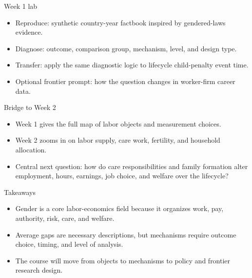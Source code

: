\documentclass[aspectratio=169,11pt]{beamer}
\begin{document}
\begin{frame}{Week 1 lab}
\begin{itemize}
    \item Reproduce: synthetic country-year factbook inspired by gendered-laws evidence.
    \item Diagnose: outcome, comparison group, mechanism, level, and design type.
    \item Transfer: apply the same diagnostic logic to lifecycle child-penalty event time.
    \item Optional frontier prompt: how the question changes in worker-firm career data.
\end{itemize}
\end{frame}

\begin{frame}{Bridge to Week 2}
\begin{itemize}
    \item Week 1 gives the full map of labor objects and measurement choices.
    \item Week 2 zooms in on labor supply, care work, fertility, and household allocation.
    \item Central next question: how do care responsibilities and family formation alter employment, hours, earnings, job choice, and welfare over the lifecycle?
\end{itemize}
\end{frame}

\begin{frame}{Takeaways}
\begin{itemize}
    \item Gender is a core labor-economics field because it organizes work, pay, authority, risk, care, and welfare.
    \item Average gaps are necessary descriptions, but mechanisms require outcome choice, timing, and level of analysis.
    \item The course will move from objects to mechanisms to policy and frontier research design.
\end{itemize}
\end{frame}
\end{document}
